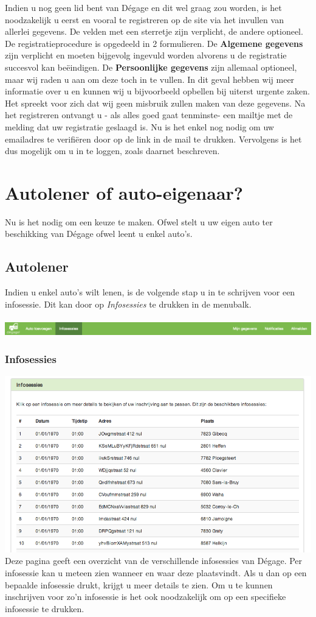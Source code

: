 \documentclass[11pt,a4paper,oneside]{article}
\begin{document}
Indien u nog geen lid bent van D\'egage en dit wel graag zou worden, is het noodzakelijk u eerst en vooral te registreren op de site via het invullen van allerlei gegevens. De velden met een sterretje zijn verplicht, de andere optioneel. De registratieprocedure is opgedeeld in 2 formulieren. De \textbf{Algemene gegevens} zijn verplicht en moeten bijgevolg ingevuld worden alvorens u de registratie succesvol kan be\"eindigen. De \textbf{Persoonlijke gegevens} zijn allemaal optioneel, maar wij raden u aan om deze toch in te vullen. In dit geval hebben wij meer informatie over u en kunnen wij u bijvoorbeeld opbellen bij uiterst urgente zaken. Het spreekt voor zich dat wij geen misbruik zullen maken van deze gegevens. Na het registreren ontvangt u - als alles goed gaat tenminste- een mailtje met de melding dat uw registratie geslaagd is. Nu is het enkel nog nodig om uw emailadres te verifi\"eren door op de link in de mail te drukken. Vervolgens is het dus mogelijk om u in te loggen, zoals daarnet beschreven.

\section{Autolener of auto-eigenaar?}
Nu is het nodig om een keuze te maken. Ofwel stelt u uw eigen auto ter beschikking van D\'egage ofwel leent u enkel auto's.
\subsection{Autolener}
Indien u enkel auto's wilt lenen, is de volgende stap u in te schrijven voor een infosessie. Dit kan door op \textit{Infosessies} te drukken in de menubalk. \\\\

\includegraphics[scale=0.4]{img/menu-autolener} 
\subsubsection{Infosessies}
\includegraphics[scale=0.75]{img/infosessies} \\
Deze pagina geeft een overzicht van de verschillende infosessies van D\'egage. Per infosessie kan u meteen zien wanneer en waar deze plaatsvindt. Als u dan op een bepaalde infosessie drukt, krijgt u meer details te zien. Om u te kunnen inschrijven voor zo'n infosessie is het ook noodzakelijk om op een specifieke infosessie te drukken.
\end{document}
